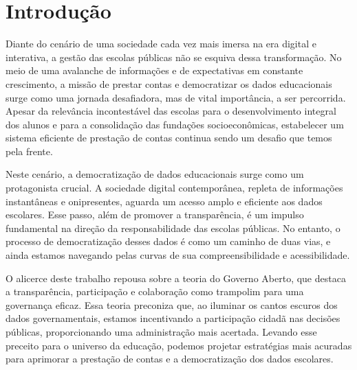 \chapter{Introdução}

Diante do cenário de uma sociedade cada vez mais imersa na era digital e interativa, a gestão das escolas públicas não se esquiva dessa transformação. No meio de uma avalanche de informações e de expectativas em constante crescimento, a missão de prestar contas e democratizar os dados educacionais surge como uma jornada desafiadora, mas de vital importância, a ser percorrida. Apesar da relevância incontestável das escolas para o desenvolvimento integral dos alunos e para a consolidação das fundações socioeconômicas, estabelecer um sistema eficiente de prestação de contas continua sendo um desafio que temos pela frente.

Neste cenário, a democratização de dados educacionais surge como um protagonista crucial. A sociedade digital contemporânea, repleta de informações instantâneas e onipresentes, aguarda um acesso amplo e eficiente aos dados escolares. Esse passo, além de promover a transparência, é um impulso fundamental na direção da responsabilidade das escolas públicas. No entanto, o processo de democratização desses dados é como um caminho de duas vias, e ainda estamos navegando pelas curvas de sua compreensibilidade e acessibilidade.

O alicerce deste trabalho repousa sobre a teoria do Governo Aberto, que destaca a transparência, participação e colaboração como trampolim para uma governança eficaz. Essa teoria preconiza que, ao iluminar os cantos escuros dos dados governamentais, estamos incentivando a participação cidadã nas decisões públicas, proporcionando uma administração mais acertada. Levando esse preceito para o universo da educação, podemos projetar estratégias mais acuradas para aprimorar a prestação de contas e a democratização dos dados escolares.

